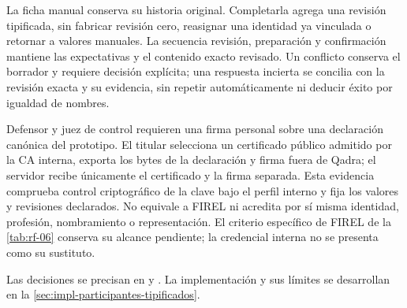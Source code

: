 La ficha manual conserva su historia original. Completarla agrega una revisión tipificada, sin fabricar revisión cero, reasignar una identidad ya vinculada o retornar a valores manuales. La secuencia revisión, preparación y confirmación mantiene las expectativas y el contenido exacto revisado. Un conflicto conserva el borrador y requiere decisión explícita; una respuesta incierta se concilia con la revisión exacta y su evidencia, sin repetir automáticamente ni deducir éxito por igualdad de nombres.

Defensor y juez de control requieren una firma personal sobre una declaración canónica del prototipo. El titular selecciona un certificado público admitido por la CA interna, exporta los bytes de la declaración y firma fuera de Qadra; el servidor recibe únicamente el certificado y la firma separada. Esta evidencia comprueba control criptográfico de la clave bajo el perfil interno y fija los valores y revisiones declarados. No equivale a FIREL ni acredita por sí misma identidad, profesión, nombramiento o representación. El criterio específico de FIREL de la \cref{tab:rf-06} conserva su alcance pendiente; la credencial interna no se presenta como su sustituto.

{\raggedright Las decisiones se precisan en  y . La implementación y sus límites se desarrollan en la \cref{sec:impl-participantes-tipificados}.\par}

